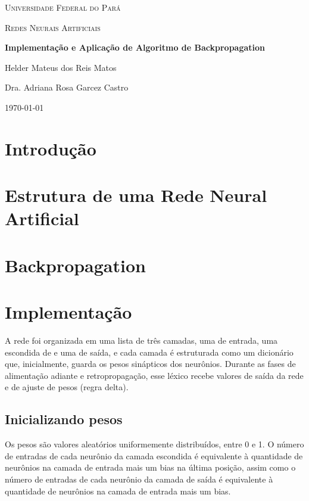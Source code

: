 \documentclass[12pt,a4paper]{article}
\begin{document}
\begin{titlepage}
	\centering
	{\scshape\LARGE Universidade Federal do Pará \par}
	\vspace{1cm}
	{\scshape\Large Redes Neurais Artificiais\par}
	\vspace{1.5cm}
	{\huge\bfseries Implementação e Aplicação de Algoritmo de Backpropagation\par}
	\vspace{2cm}
	{\Large Helder Mateus dos Reis Matos\par}
	\vfill
	Dra. Adriana Rosa Garcez Castro
	\vfill
	{\large \today\par}
\end{titlepage}

\tableofcontents

\section{Introdução}

\section{Estrutura de uma Rede Neural Artificial}

\section{Backpropagation}

\section{Implementação}
\qquad A rede foi organizada em uma lista de três camadas, uma de entrada, uma escondida de e uma de saída, e cada camada é estruturada como um dicionário que, inicialmente, guarda os pesos sinápticos dos neurônios. Durante as fases de alimentação adiante e retropropagação, esse léxico recebe valores de saída da rede e de ajuste de pesos (regra delta).

\subsection{Inicializando pesos}

\qquad Os pesos são valores aleatórios uniformemente distribuídos, entre 0 e 1. O número de entradas de cada neurônio da camada escondida é equivalente à quantidade de neurônios na camada de entrada mais um bias na última posição, assim como o número de entradas de cada neurônio da camada de saída é equivalente à quantidade de neurônios na camada de entrada mais um bias.\\
\end{document}
